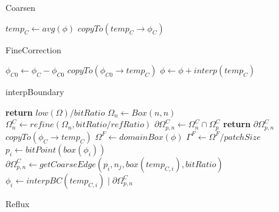 \documentclass[12pt,a4paper]{article}
\begin{document}
\begin{algorithm}
\caption{Coarsen}
\begin{algorithmic}[1]
\State $temp_C \gets avg(\phi)$
\State $copyTo(temp_C\rightarrow\phi_C)$ 
\EndProcedure
\end{algorithmic}
\end{algorithm}


\begin{algorithm}
\caption{FineCorrection}
\begin{algorithmic}[1]
\State $\phi_{C0} \gets \phi_C - \phi_{C0}$
\State $copyTo(\phi_{C0}\rightarrow temp_C)$ 
\State $\phi \gets \phi + interp(temp_C)$
\EndProcedure
\end{algorithmic}
\end{algorithm}

\begin{algorithm}
\caption{interpBoundary}
\begin{algorithmic}[1]
\State \textbf{return} $low(\Omega)/bitRatio$
\EndProcedure
{}
\State $\Omega_n \gets Box(n,n)$
\State $\Omega_n^C \gets refine(\Omega_n, bitRatio / refRatio)$
\State $\partial\Omega_{p,n}^C \gets \Omega_n^C \cap \Omega_p^C$
\State \textbf{return} $\partial\Omega_{p,n}^C$
\EndProcedure
{}
\State $copyTo(\phi_C \rightarrow temp_C)$
\State $\Omega^F \gets domainBox(\phi)$
\State $\Gamma^F\gets \Omega^F / patchSize$
	\State $p_i \gets bitPoint(box(\phi_i))$ 
			\State $\partial\Omega_{p,n}^C \gets getCoarseEdge(p_i, n_j,box(temp_{C,i}),bitRatio)$
			\State $\phi_i \gets interpBC(temp_{C,i}) \mid \partial\Omega_{p,n}^C$
		\EndIf
	\EndFor
\EndFor
\EndProcedure
\end{algorithmic}
\end{algorithm}

\begin{algorithm}
\caption{Reflux}
\begin{algorithmic}[1]
 
 \\
\EndProcedure
\end{algorithmic}
\end{algorithm}
\end{document}
